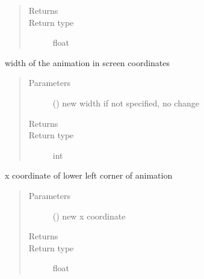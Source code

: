 \documentclass[letterpaper,10pt,english]{sphinxmanual}
\begin{document}
\begin{fulllineitems}
\begin{fulllineitems}
\begin{quote}
\begin{description}
\item[{Returns}] \leavevmode
{}

\item[{Return type}] \leavevmode
float

\end{description}\end{quote}

\end{fulllineitems}


\begin{fulllineitems}
\label{\detokenize{Reference:salabim.Environment.width}}
width of the animation in screen coordinates
\begin{quote}\begin{description}
\item[{Parameters}] \leavevmode
{} () \textendash{} new width 
if not specified, no change

\item[{Returns}] \leavevmode
{}

\item[{Return type}] \leavevmode
int

\end{description}\end{quote}

\end{fulllineitems}


\begin{fulllineitems}
\label{\detokenize{Reference:salabim.Environment.x0}}
x coordinate of lower left corner of animation
\begin{quote}\begin{description}
\item[{Parameters}] \leavevmode
{} () \textendash{} new x coordinate

\item[{Returns}] \leavevmode
{}

\item[{Return type}] \leavevmode
float


\end{description}
\end{quote}
\end{fulllineitems}
\end{fulllineitems}
\end{document}
